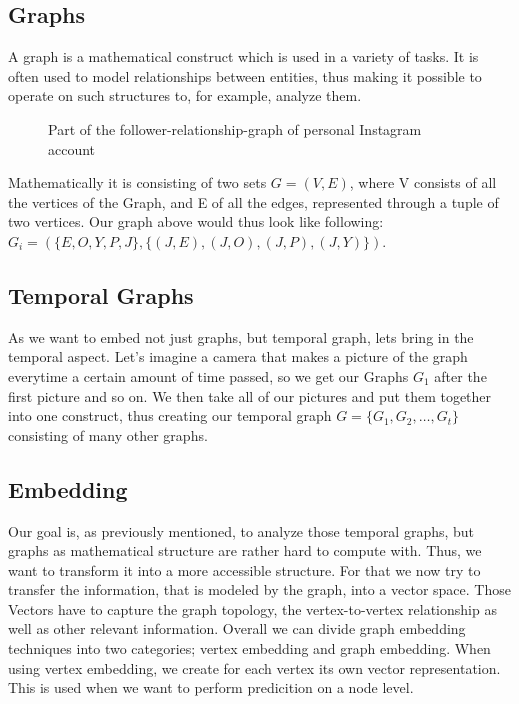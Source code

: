 \documentclass[sigconf]{acmart}
\begin{document}
\subsection{Graphs}

A graph is a mathematical construct which is used in a variety of tasks. It is often used to model relationships between 
entities, thus making it possible to operate on such structures to, for example, analyze them.\\
\begin{figure}[h]
  \begin{center}
\end{center}
\caption{Part of the follower-relationship-graph of personal Instagram account}
\end{figure}


 Mathematically it is consisting of two sets \(G = (V, E)\), where V consists of all the vertices of the Graph, and E of all the edges, represented through a tuple of two vertices.
 Our graph above would thus look like following: \\
 \( G_i = (\{E,O,Y,P,J\}, \{(J,E),(J,O), (J,P), (J,Y)\}) \).

\subsection{Temporal Graphs}
As we want to embed not just graphs, but temporal graph, lets bring in the temporal aspect. Let's imagine a camera that makes a picture of the graph everytime a certain 
amount of time passed, so we get our Graphs \(G_1\) after the first picture and so on. We then take all of our pictures and put them together into one construct, 
thus creating our temporal graph \(G = \{G_1, G_2,\ldots ,G_t\}\) consisting of many other graphs.\cite{temporalGraphs}

\subsection{Embedding}
Our goal is, as previously mentioned, to analyze those temporal graphs, but graphs as mathematical structure are rather hard to compute with. 
Thus, we want to transform it into a more accessible structure. For that we now try to transfer the information, that is modeled by the graph, into a vector space.
Those Vectors have to capture the graph topology, the vertex-to-vertex relationship as well as other relevant information. Overall we can divide graph embedding techniques into two 
categories; vertex embedding and graph embedding. When using vertex embedding, we create for each vertex its own vector representation. This is used when we want to perform predicition 
on a node level.
\end{document}
